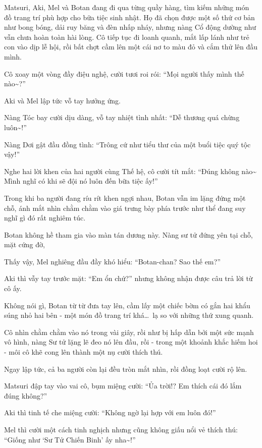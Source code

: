 \documentclass[../main.tex]{subfiles}
\begin{document}
Matsuri, Aki, Mel và Botan đang đi qua từng quầy hàng, tìm kiếm những món đồ trang trí phù hợp cho bữa tiệc sinh nhật. Họ đã chọn được một số thứ cơ bản như bong bóng, dải ruy băng và đèn nhấp nháy, nhưng nàng Cổ động dường như vẫn chưa hoàn toàn hài lòng. Cô tiếp tục đi loanh quanh, mắt lấp lánh như trẻ con vào dịp lễ hội, rồi bất chợt cầm lên một cái nơ to màu đỏ và cắm thử lên đầu mình.

Cô xoay một vòng đầy điệu nghệ, cười tươi roi rói: ``Mọi người thấy mình thế nào\~{}?''

Aki và Mel lập tức vỗ tay hưởng ứng.

Nàng Tóc bay cười dịu dàng, vỗ tay nhiệt tình nhất: ``Dễ thương quá chừng luôn\~{}!''

Nàng Dơi gật đầu đồng tình: ``Trông cứ như tiểu thư của một buổi tiệc quý tộc vậy!''

Nghe hai lời khen của hai người cùng Thế hệ, cô cười tít mắt: ``Đúng không nào\~{} Mình nghĩ có khi sẽ đội nó luôn đến bữa tiệc ấy!''

Trong khi ba người đang ríu rít khen ngợi nhau, Botan vẫn im lặng đứng một chỗ, ánh mắt nhìn chằm chằm vào giá trưng bày phía trước như thể đang suy nghĩ gì đó rất nghiêm túc.

Botan không hề tham gia vào màn tán dương này. Nàng sư tử đứng yên tại chỗ, mặt cứng đờ,

Thấy vậy, Mel nghiêng đầu đầy khó hiểu: ``Botan-chan? Sao thế em?''

Aki thì vẫy tay trước mặt: ``Em ổn chứ?'' nhưng không nhận được câu trả lời từ cô ấy.

Không nói gì, Botan từ từ đưa tay lên, cầm lấy một chiếc bờm có gắn hai khẩu súng nhỏ hai bên - một món đồ trang trí khá\dots\ lạ so với những thứ xung quanh.

Cô nhìn chằm chằm vào nó trong vài giây, rồi như bị hấp dẫn bởi một sức mạnh vô hình, nàng Sư tử lặng lẽ đeo nó lên đầu, rồi - trong một khoảnh khắc hiếm hoi - môi cô khẽ cong lên thành một nụ cười thích thú.

Ngay lập tức, cả ba người còn lại đều tròn mắt nhìn, rồi đồng loạt cười rộ lên.

Matsuri đập tay vào vai cô, bụm miệng cười: ``Ủa trời!? Em thích cái đó lắm đúng không?''

Aki thì tinh tế che miệng cười: ``Không ngờ lại hợp với em luôn đó!''

Mel thì cười một cách tinh nghịch nhưng cũng không giấu nổi vẻ thích thú: ``Giống như `Sư Tử Chiến Binh' ấy nha\~{}!''
\end{document}

